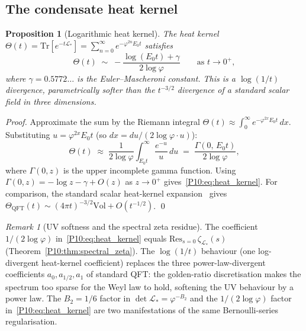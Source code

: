 \documentclass[11pt,a4paper]{article}
\newtheorem{proposition}[theorem]{Proposition}
\theoremstyle{definition}
\theoremstyle{remark}
\newtheorem{remark}[theorem]{Remark}
\newcommand{\vp}{\varphi}
\begin{document}
\subsection{The condensate heat kernel}

\begin{proposition}[Logarithmic heat kernel]
\label{P10:prop:heat_kernel}
The heat kernel
$\Theta(t) = \mathrm{Tr}[e^{-t\mathcal{L}_*}]
= \sum_{n=0}^\infty e^{-\vp^{2n}E_0 t}$
satisfies
\begin{equation}
  \Theta(t)
  \;\sim\; -\frac{\log(E_0 t)+\gamma}{2\log\vp}
  \qquad\text{as }t\to0^+,
  \label{P10:eq:heat_kernel}
\end{equation}
where $\gamma = 0.5772\ldots$ is the Euler--Mascheroni constant.
This is a $\log(1/t)$ divergence, parametrically softer than the
$t^{-3/2}$ divergence of a standard scalar field in three dimensions.
\end{proposition}

\begin{proof}
Approximate the sum by the Riemann integral
$\Theta(t)\approx\int_0^\infty e^{-\vp^{2x}E_0 t}\,dx$.
Substituting $u=\vp^{2x}E_0 t$ (so $dx = du/(2\log\vp\cdot u)$):
\begin{equation}
  \Theta(t)\;\approx\;
  \frac{1}{2\log\vp}\int_{E_0 t}^\infty\frac{e^{-u}}{u}\,du
  \;=\; \frac{\Gamma(0,\,E_0 t)}{2\log\vp},
  \label{P10:eq:theta_gamma}
\end{equation}
where $\Gamma(0,z)$ is the upper incomplete gamma function.
Using $\Gamma(0,z)=-\log z - \gamma + O(z)$ as $z\to0^+$
gives~\eqref{P10:eq:heat_kernel}.
For comparison, the standard scalar heat-kernel expansion~\cite{Vassilevich2003}
gives $\Theta_\mathrm{QFT}(t)\sim(4\pi t)^{-3/2}\mathrm{Vol}+O(t^{-1/2})$.
\qed
\end{proof}

\begin{remark}[UV softness and the spectral zeta residue]
\label{P10:rem:uv_softness_residue}
The coefficient $1/(2\log\vp)$ in~\eqref{P10:eq:heat_kernel} equals
$\mathrm{Res}_{s=0}\,\zeta_{\mathcal{L}_*}(s)$
(Theorem~\ref{P10:thm:spectral_zeta}).
The $\log(1/t)$ behaviour (one log-divergent heat-kernel coefficient)
replaces the three power-law-divergent coefficients $a_0,a_{1/2},a_1$
of standard QFT: the golden-ratio discretisation
makes the spectrum too sparse for the Weyl law to hold, softening
the UV behaviour by a power law.
The $B_2=1/6$ factor in $\det\mathcal{L}_*=\vp^{-B_2}$ and the
$1/(2\log\vp)$ factor in~\eqref{P10:eq:heat_kernel} are two manifestations
of the same Bernoulli-series regularisation.
\end{remark}
\end{document}
